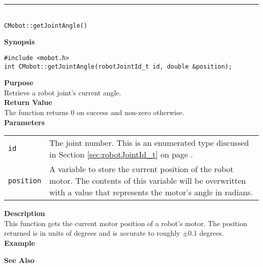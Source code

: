 \noindent
\vspace{5pt}
\rule{4.5in}{0.015in}\\
\noindent
{\LARGE \texttt{CMobot::getJointAngle()}}\\
{}

\noindent
{\bf Synopsis}\\
\begin{verbatim}
#include <mobot.h>
int CMobot::getJointAngle(robotJointId_t id, double &position);
\end{verbatim}

\noindent
{\bf Purpose}\\
Retrieve a robot joint's current angle.\\

\noindent
{\bf Return Value}\\
The function returns 0 on success and non-zero otherwise.\\

\noindent
{\bf Parameters}\\
\vspace{-0.1in}
\begin{description}
\item               
\begin{tabular}{p{15 mm}p{105 mm}}
\texttt{id} & The joint number. This is an enumerated type 
discussed in Section \ref{sec:robotJointId_t} on page
\pageref{sec:robotJointId_t}.\\
\texttt{position} & A variable to store the current position of the robot
motor. The contents of this variable will be overwritten with a value that
represents the motor's angle in radians.  \\
\end{tabular}
\end{description}

\noindent
{\bf Description}\\
This function gets the current motor position of a robot's motor. The
position returned is in units of degrees and is accurate to roughly $\pm0.1$
degrees. \\

\noindent
{\bf Example}\\
\noindent

\noindent
{\bf See Also}\\

